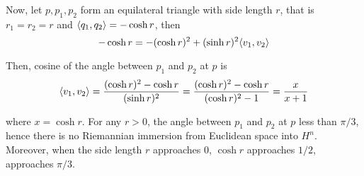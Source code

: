 \begin{longproof}
	Now, let $p, p_1, p_2$ form an equilateral triangle with side length $r$, that is $r_1 = r_2 = r$ and $\langle q_1, q_2\rangle = - \cosh r$, then
	$$
		- \cosh r = - (\cosh r)^2 + (\sinh r)^2 \langle v_1, v_2\rangle
	$$
	
	Then, cosine of the angle between $p_1$ and $p_2$ at $p$ is
	$$
		\langle v_1, v_2\rangle = \frac{(\cosh r)^2 - \cosh r}{(\sinh r)^2} = \frac{(\cosh r)^2 - \cosh r}{(\cosh r)^2 - 1} = \frac{x}{x + 1}
	$$
	
	where $x = \cosh r$. For any $r > 0$, the angle between $p_1$ and $p_2$ at $p$ less than $\pi / 3$, hence there is no Riemannian immersion from Euclidean space into $H^n$. Moreover, when the side length $r$ approaches $0$, $\cosh r$ approaches $1/2$,  approaches $\pi / 3$.
\end{longproof}
